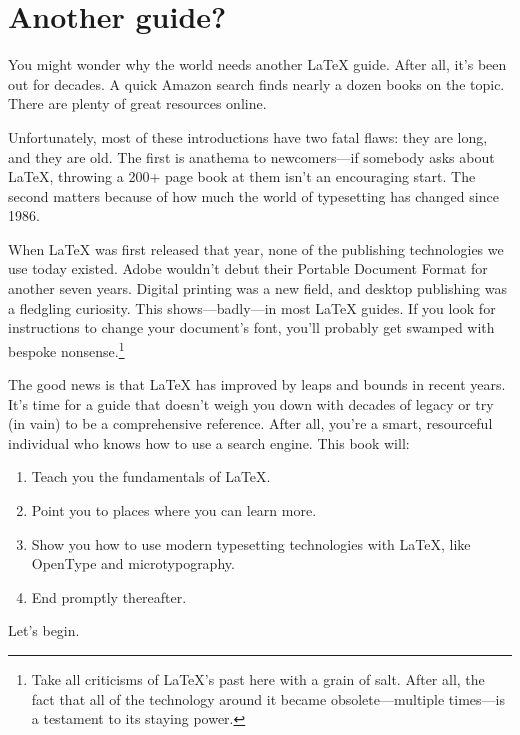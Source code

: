 \section{Another guide?}

You might wonder why the world needs another \LaTeX{} guide.
After all, it's been out for decades.
A quick Amazon search finds nearly a dozen books on the topic.
There are plenty of great resources online.

Unfortunately, most of these introductions have two fatal flaws: they are long,
and they are old.
The first is anathema to newcomers---if somebody asks about \LaTeX{},
throwing a 200+ page book at them isn't an encouraging start.
The second matters because of how much the world of typesetting has
changed since 1986.

When \LaTeX{} was first released that year, none of the publishing technologies
we use today existed.
Adobe wouldn't debut their Portable Document Format for another seven years.
Digital printing was a new field, and desktop publishing was a fledgling
curiosity.\punckern{}
This shows---badly---in most \LaTeX{} guides.
If you look for instructions to change your document's font,
you'll probably get swamped with bespoke nonsense.\punckern\footnote{%
Take all criticisms of \LaTeX's past here with a grain of
salt. After all, the fact that all of the technology around it became
obsolete---multiple times---is a testament to its staying power.}

The good news is that  \LaTeX{} has improved by leaps and bounds in recent years.
It's time for a guide that doesn't weigh you down with decades of legacy
or try (in vain) to be a comprehensive reference.
After all, you're a smart, resourceful individual who knows how to use a search
engine.
This book will:
\clearpage

\begin{enumerate}
\item Teach you the fundamentals of \LaTeX.
\item Point you to places where you can learn more.
\item Show you how to use modern typesetting technologies with \LaTeX,
    like OpenType and microtypography.
\item End promptly thereafter.
\end{enumerate}
\vspace{\baselineskip}

\noindent Let's begin.
